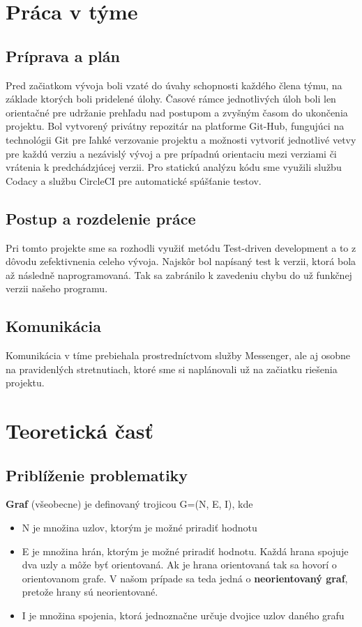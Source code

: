 \documentclass[a4paper,11pt]{article}
\begin{document}
\section{Práca v týme}
\subsection{Príprava a plán}
Pred začiatkom vývoja boli vzaté do úvahy schopnosti každého člena týmu, na základe ktorých boli pridelené úlohy. Časové rámce jednotlivých úloh boli len orientačné pre udržanie prehľadu nad postupom a zvyšným časom do ukončenia projektu. Bol vytvorený privátny repozitár na platforme Git-Hub, fungujúci na technológii Git pre ľahké verzovanie projektu a možnosti vytvoriť jednotlivé vetvy pre každú verziu a nezávislý vývoj a pre prípadnú orientaciu mezi verziami či vrátenia k predchádzjúcej verzii. Pro statickú analýzu kódu sme využili službu Codacy a službu CircleCI pre automatické spúšťanie testov.
\subsection{Postup a rozdelenie práce}
Pri tomto projekte sme sa rozhodli využiť metódu Test-driven development a to z dôvodu zefektivnenia celeho vývoja. Najskôr bol napísaný test k verzii, ktorá bola až následně naprogramovaná. Tak sa zabránilo k zavedeniu chybu do už funkčnej verzii našeho programu.
\subsection{Komunikácia}
Komunikácia v tíme prebiehala prostredníctvom služby Messenger, ale aj osobne na pravidenlých stretnutiach, ktoré sme si naplánovali už na začiatku riešenia projektu.

\section{Teoretická časť}
\subsection{Priblíženie problematiky}
\textbf{Graf} (všeobecne) je definovaný trojicou G=(N, E, I), kde 
\begin{itemize}
    \item N je množina uzlov, ktorým je možné priradiť hodnotu
    \item E je množina hrán, ktorým je možné priradiť hodnotu. Každá hrana spojuje dva uzly a môže byť orientovaná. Ak je hrana orientovaná tak sa hovorí o orientovanom grafe. V našom prípade sa teda jedná o \textbf{neorientovaný graf}, pretože hrany sú neorientované.
    \item I je množina spojenia, ktorá jednoznačne určuje dvojice uzlov daného grafu
\end{itemize}
\end{document}

